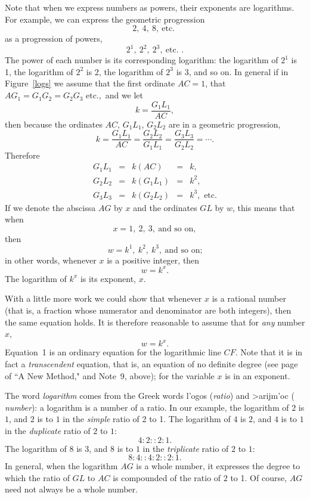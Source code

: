 \documentclass[twoside,openright]{article}
\newlength{\oldjot}
\begin{document}
Note that when we express numbers as powers, their exponents are
logarithms.  For example, we can express the geometric progression
$$2,\ 4,\ 8,\ \mbox{etc. }$$
as a progression of powers,
$$2^1,\ 2^2,\ 2^3,\ \mbox{etc. }.$$
The power of each number is its corresponding logarithm: the logarithm
of $2^1$ is 1, the logarithm of $2^2$ is 2, the logarithm of $2^3$ is
3, and so on.  In general if in Figure~\ref{logs} we assume that the
first ordinate $AC=1$, that $AG_1= G_1G_2= G_2G_3 \mbox{ etc.}$,\ and
we let
$$k = \frac{G_1L_1}{AC},$$
then because the ordinates $AC$, $G_1L_1$, $G_2L_2$ are in a geometric progression, 
$$k = \frac{G_1L_1}{AC} = \frac{G_2L_2}{G_1L_1} =  \frac{G_3L_3}{G_2L_2} =  \cdots.$$
Therefore
$$\begin{array}{lclcl}
G_1L_1 & = & k(AC )&  =&  k,\\
G_2L_2 &  = & k(G_1L_1) & = & k^2,\\
G_3L_3 &  = & k(G_2L_2) & = & k^3,\mbox{ etc.}
\end{array}$$
\setlength{\jot}{\oldjot}
\hspace{-.6em} If we denote the abscissa $AG$ by $x$ and the ordinates $GL$ by $w$, this means that when 
$$x = 1,\ 2,\ 3,\ \mbox{and so on},$$
then
$$w = k^1,\ k^2,\ k^3,\ \mbox{and so on;}$$
in other words, whenever $x$ is a positive integer, then
$$w = k^x.$$
The logarithm of $k^x$ is its exponent, $x$.

With a little more work we could show that whenever $x$ is a rational
number (that is, a fraction whose numerator and denominator are both
integers), then the same equation holds.  It is therefore reasonable
to assume that for {\em any} number $x$, \setcounter{equation}{0}
\begin{equation}
w = k^x.
\end{equation}
Equation~1 is an ordinary equation for the logarithmic line $CF$.
Note that it is in fact a {\em transcendent} equation, that is, an
equation of no definite degree (see page~\pageref{trandef} of ``A New
Method," and Note~9, above); for the variable $x$ is in an exponent.

The word {\em logarithm} comes from the Greek words
\foreignlanguage{greek}{l'ogos} ({\em ratio}) and
\foreignlanguage{greek}{>arijm'oc} ({\em
  number}): a logarithm is a number of a ratio.
In our example, the logarithm of $2$ is $1$, and $2$ is to $1$ in the
{\em simple} ratio of 2 to 1.  The logarithm of $4$ is $2$, and $4$ is
to $1$ in the {\em duplicate} ratio of $2$ to $1$:
$$4\!:\! 2 :: 2\!:\! 1.$$
The logarithm of $8$ is $3$, and $8$ is to $1$ in the {\em triplicate} ratio of $2$ to $1$:
$$8\!:\!  4 :: 4\!:\! 2 :: 2\!:\! 1.$$
In general, when the logarithm $AG$ is a whole number, it expresses
the degree to which the ratio of $GL$ to $AC$ is compounded of the
ratio of $2$ to 1.  Of course, $AG$ need not always be a whole number.
\end{document}
